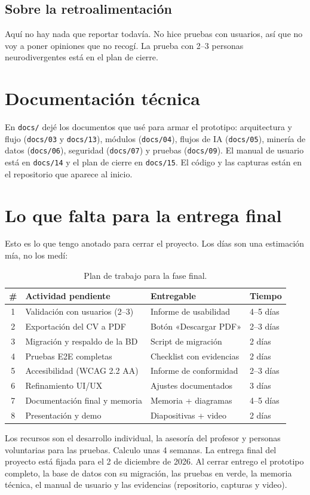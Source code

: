 \documentclass[runningheads]{llncs}
\begin{document}
\subsection{Sobre la retroalimentación}
Aquí no hay nada que reportar todavía. No hice pruebas con usuarios, así que no voy a poner
opiniones que no recogí. La prueba con 2--3 personas neurodivergentes está en el plan de cierre.

\section{Documentación técnica}
En \texttt{docs/} dejé los documentos que usé para armar el prototipo: arquitectura y flujo
(\texttt{docs/03} y \texttt{docs/13}), módulos (\texttt{docs/04}), flujos de IA
(\texttt{docs/05}), minería de datos (\texttt{docs/06}), seguridad (\texttt{docs/07}) y pruebas
(\texttt{docs/09}). El manual de usuario está en \texttt{docs/14} y el plan de cierre en
\texttt{docs/15}. El código y las capturas están en el repositorio que aparece al inicio.

\section{Lo que falta para la entrega final}
Esto es lo que tengo anotado para cerrar el proyecto. Los días son una estimación mía, no los
medí:

\begin{table}[htbp]
\caption{Plan de trabajo para la fase final.}
\label{tab:plan}
\centering
\small
\begin{tabular}{clll}
\toprule
\# & Actividad pendiente & Entregable & Tiempo\\
\midrule
1 & Validación con usuarios (2--3) & Informe de usabilidad & 4--5 días\\
2 & Exportación del CV a PDF & Botón «Descargar PDF» & 2--3 días\\
3 & Migración y respaldo de la BD & Script de migración & 2 días\\
4 & Pruebas E2E completas & Checklist con evidencias & 2 días\\
5 & Accesibilidad (WCAG 2.2 AA) & Informe de conformidad & 2--3 días\\
6 & Refinamiento UI/UX & Ajustes documentados & 3 días\\
7 & Documentación final y memoria & Memoria + diagramas & 4--5 días\\
8 & Presentación y demo & Diapositivas + video & 2 días\\
\bottomrule
\end{tabular}
\end{table}

\noindent Los recursos son el desarrollo individual, la asesoría del profesor y personas
voluntarias para las pruebas. Calculo unas 4 semanas. La entrega final del proyecto está
fijada para el 2 de diciembre de 2026. Al cerrar entrego el prototipo completo, la base de
datos con su migración, las pruebas en verde, la memoria técnica, el manual de usuario y las
evidencias (repositorio, capturas y video).
\end{document}
